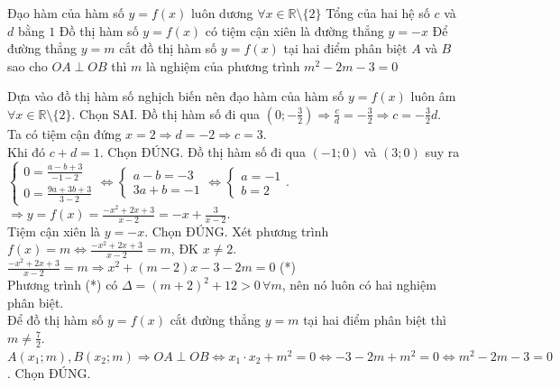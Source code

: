 \begin{ex}
\begin{center}
\begin{tikzpicture}[>=stealth, scale=0.8]
		\end{tikzpicture}
	\end{center}
	\choiceTF
	{Đạo hàm của hàm số $y = f(x)$ luôn dương $\forall x \in \mathbb{R} \setminus \{2\}$}
	{\True Tổng của hai hệ số $c$ và $d$ bằng $1$}
	{\True Đồ thị hàm số $y = f(x)$ có tiệm cận xiên là đường thẳng $y = -x$}
	{\True Để đường thẳng $y = m$ cắt đồ thị hàm số $y = f(x)$ tại hai điểm phân biệt $A$ và $B$ sao cho $OA \perp OB$ thì $m$ là nghiệm của phương trình $m^2 - 2m - 3 = 0$}
	\loigiai
	{
		\begin{itemchoice}
			\itemch Dựa vào đồ thị hàm số nghịch biến nên đạo hàm của hàm số $y = f(x)$ luôn âm $\forall x \in \mathbb{R} \setminus \{2\}$. Chọn SAI.
			\itemch Đồ thị hàm số đi qua $\left(0; -\frac{3}{2}\right) \Rightarrow \frac{c}{d} = -\frac{3}{2} \Rightarrow c = -\frac{3}{2}d$.\\
			Ta có tiệm cận đứng $x = 2 \Rightarrow d = -2 \Rightarrow c = 3$.\\
			Khi đó $c + d = 1$. Chọn ĐÚNG.
			\itemch Đồ thị hàm số đi qua $(-1; 0)$ và $(3; 0)$ suy ra\\
			$\begin{cases} 0 = \frac{a - b + 3}{-1 - 2} \\ 0 = \frac{9a + 3b + 3}{3 - 2} \end{cases} \Leftrightarrow \begin{cases} a - b = -3 \\ 3a + b = -1 \end{cases} \Leftrightarrow \begin{cases} a = -1 \\ b = 2 \end{cases}$.\\
			$\displaystyle \Rightarrow y = f(x) = \frac{-x^2 + 2x + 3}{x - 2} = -x + \frac{3}{x - 2}$.\\
			Tiệm cận xiên là $y = -x$. Chọn ĐÚNG.
			\itemch Xét phương trình $\displaystyle f(x) = m \Leftrightarrow \frac{-x^2 + 2x + 3}{x - 2} = m$, ĐK $x \neq 2$.\\
			$\displaystyle \frac{-x^2 + 2x + 3}{x - 2} = m \Rightarrow x^2 + (m - 2)x - 3 - 2m = 0$ (*)\\
			Phương trình (*) có $\Delta = (m + 2)^2 + 12 > 0 \, \forall m$, nên nó luôn có hai nghiệm phân biệt.\\
			Để đồ thị hàm số $y = f(x)$ cắt đường thẳng $y = m$ tại hai điểm phân biệt thì $m \neq \frac{7}{2}$.\\
			$A(x_1; m), B(x_2; m) \Rightarrow OA \perp OB \Leftrightarrow x_1 \cdot x_2 + m^2 = 0 \Leftrightarrow -3 - 2m + m^2 = 0 \Leftrightarrow m^2 - 2m - 3 = 0$. Chọn ĐÚNG.
		\end{itemchoice}
	}
\end{ex}

